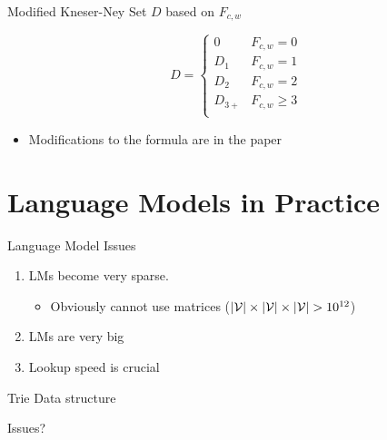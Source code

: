 \documentclass{beamer}
\begin{document}
\begin{frame}{Modified Kneser-Ney}
  Set $D$ based on $F_{c, w}$ 
  
  \[D =
    \begin{cases}
      0 & F_{c, w} = 0 \\
      D_1 & F_{c, w} = 1 \\
      D_2 & F_{c, w} = 2 \\
      D_{3+} & F_{c, w} \geq 3 \\
    \end{cases}
  \] 

  \begin{itemize}
  \item Modifications to the formula are in the paper
  \end{itemize}

\end{frame}


\section{Language Models in Practice}

\begin{frame}{Language Model Issues}
  \begin{enumerate}
  \item LMs become very sparse. 
    \begin{itemize}
    \item Obviously cannot use matrices
      ($|\mathcal{V}| \times|\mathcal{V}|\times|\mathcal{V}| > 10^{12} $)
    \end{itemize}
    \air
  \item LMs are very big
    \air 
  \item Lookup speed is crucial
  \end{enumerate}
\end{frame}

\begin{frame}{Trie Data structure}


  \begin{center}
  \end{center}


  Issues?


\end{frame}
\end{document}
